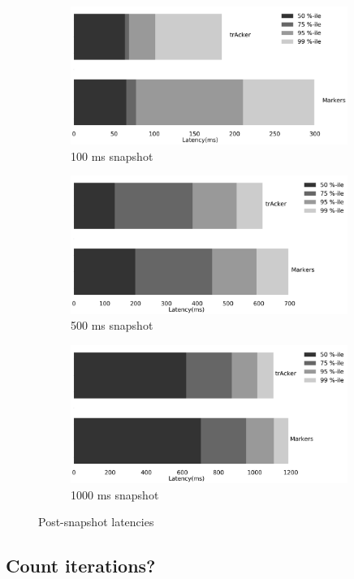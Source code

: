 \begin{figure}[t!]
    \begin{subfigure}[b]{0.32\textwidth}
            \includegraphics[width=0.99\textwidth]{pics/buffering_latencies_barh_100.png}
            \caption{100 ms snapshot}
    \end{subfigure}
    \hspace{5mm}
    \begin{subfigure}[b]{0.32\textwidth}
            \includegraphics[width=0.99\textwidth]{pics/buffering_latencies_barh_500.png}
            \caption{500 ms snapshot}
    \end{subfigure}
    \hspace{5mm}
    \begin{subfigure}[b]{0.32\textwidth}
            \includegraphics[width=0.99\textwidth]{pics/buffering_latencies_barh_1000.png}
            \caption{1000 ms snapshot}
    \end{subfigure}
    \caption{Post-snapshot latencies}
\end{figure}

\subsection{Count iterations?}

